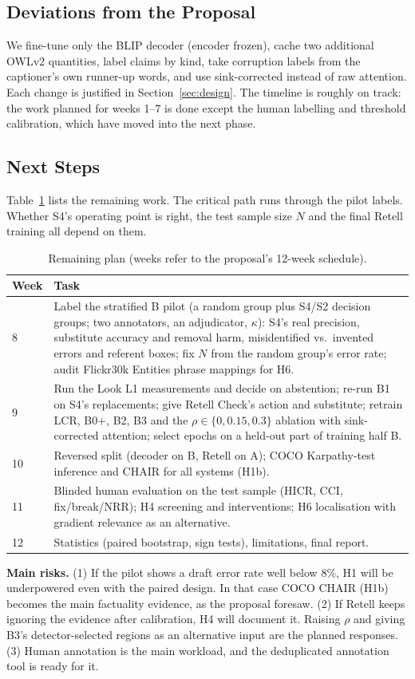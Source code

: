 \subsection{Deviations from the Proposal}
We fine-tune only the BLIP decoder (encoder frozen), cache two additional OWLv2 quantities, label claims by kind, take corruption labels from the captioner's own runner-up words, and use sink-corrected instead of raw attention. Each change is justified in Section~\ref{sec:design}. The timeline is roughly on track: the work planned for weeks 1--7 is done except the human labelling and threshold calibration, which have moved into the next phase.

\subsection{Next Steps}
Table~\ref{tab:plan} lists the remaining work. The critical path runs through the pilot labels. Whether S4's operating point is right, the test sample size $N$ and the final Retell training all depend on them.

\begin{table}[t]
\caption{Remaining plan (weeks refer to the proposal's 12-week schedule).}
\label{tab:plan}
\centering\footnotesize
\begin{tabular}{@{}p{1.1cm}p{6.6cm}@{}}
\toprule
Week & Task \\
\midrule
8 & Label the stratified B pilot (a random group plus S4/S2 decision groups; two annotators, an adjudicator, $\kappa$): S4's real precision, substitute accuracy and removal harm, misidentified vs.\ invented errors and referent boxes; fix $N$ from the random group's error rate; audit Flickr30k Entities phrase mappings for H6. \\
9 & Run the Look L1 measurements and decide on abstention; re-run B1 on S4's replacements; give Retell Check's action and substitute; retrain LCR, B0+, B2, B3 and the $\rho\in\{0,0.15,0.3\}$ ablation with sink-corrected attention; select epochs on a held-out part of training half B. \\
10 & Reversed split (decoder on B, Retell on A); COCO Karpathy-test inference and CHAIR for all systems (H1b). \\
11 & Blinded human evaluation on the test sample (HICR, CCI, fix/break/NRR); H4 screening and interventions; H6 localisation with gradient relevance as an alternative. \\
12 & Statistics (paired bootstrap, sign tests), limitations, final report. \\
\bottomrule
\end{tabular}
\end{table}

\textbf{Main risks.} (1) If the pilot shows a draft error rate well below 8\%, H1 will be underpowered even with the paired design. In that case COCO CHAIR (H1b) becomes the main factuality evidence, as the proposal foresaw. (2) If Retell keeps ignoring the evidence after calibration, H4 will document it. Raising $\rho$ and giving B3's detector-selected regions as an alternative input are the planned responses. (3) Human annotation is the main workload, and the deduplicated annotation tool is ready for it.

